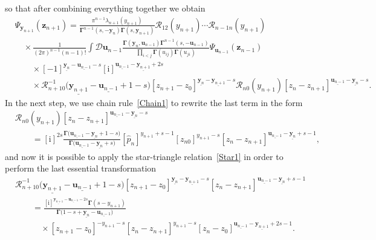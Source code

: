 \documentclass[pdftex]{sigma}
\renewcommand{\imath}{\mathrm{i}}
\numberwithin{equation}{section}
\begin{document}
so that after combining everything together we obtain
\begin{align*}
	&
\Psi_{\bm{y}_{n+1}}(\bm{z}_{n+1}) =
\frac{\pi^{n-1} \lambda_{n+1}(y_{n+1})}
{\mathbf{\Gamma}^{n-1}(s ,-\bm{y}_{n})
\mathbf{\Gamma}(s ,\bm{y}_{n+1})}
\mathcal{R}_{12}(y_{n+1})\cdots
\mathcal{R}_{n-1 n}(y_{n+1})\\
& \quad\times
\frac{1}
{(2\pi)^{n-1} (n-1)!} \int \mathcal{D}\bm{u}_{n-1}
\frac{\mathbf{\Gamma}(\bm y_{n},\bm u_{n-1}) \mathbf{\Gamma}^{n-1}(s ,-\bm{u}_{n-1})}
{\prod\limits_{i<j}\mathbf{\Gamma}(u_{ij})\mathbf{\Gamma}(u_{ji})}
\Psi_{\bm{u}_{n-1}}(\bm{z}_{n-1}) \\
& \qquad \times
[-1]^{\underline{\bm{y}_{n}}-\underline{\bm{u}_{n-1}}-s}
[\imath]^{\underline{\bm{u}_{n-1}}-\underline{\bm{y}_{n+1}}+2s}
\\
& \qquad \times
\mathcal{R}^{-1}_{n+1 0}
\bigl(\underline{\bm{y}_{n+1}}-\underline{\bm{u}_{n-1}}+1-s\bigr)
[z_{n+1}-z_0]^{\underline{\bm{y}_{n}}-\underline{\bm{y}_{n+1}}-s}
\mathcal{R}_{n 0}(y_{n+1})
[z_n-z_{n+1}]^{\underline{\bm{u}_{n-1}}-\underline{\bm{y}_{n}}-s}.
\end{align*}
In the next step, we use chain rule~\eqref{Chain1} to rewrite the
last term in the form
\begin{align*}
&
\mathcal{R}_{n 0}(y_{n+1})
[z_n-z_{n+1}]^{\underline{\bm{u}_{n-1}}-\underline{\bm{y}_{n}}-s} \\
& \qquad =
[\imath]^{2s}\frac{\mathbf{\Gamma}\bigl(\underline{\bm{u}_{n-1}}-
\underline{\bm{y}_{n}}+1-s\bigr)}
{\mathbf{\Gamma}\bigl(\underline{\bm{u}_{n-1}}-
\underline{\bm{y}_{n}}+s\bigr)}
[\hat{p}_n]^{y_{n+1}+s-1}
[z_{n0}]^{y_{n+1}-s}
[z_n-z_{n+1}]^{\underline{\bm{u}_{n-1}}-\underline{\bm{y}_{n}}+s-1} ,
\end{align*}
and now it is possible to apply the star-triangle relation~\eqref{Star1}
in order to perform the last essential transformation
\begin{align*}
&
\mathcal{R}^{-1}_{n+1 0}
\bigl(\underline{\bm{y}_{n+1}}-\underline{\bm{u}_{n-1}}+1-s\bigr)
[z_{n+1}-z_0]^{\underline{\bm{y}_{n}}-\underline{\bm{y}_{n+1}}-s}
[z_n-z_{n+1}]^{\underline{\bm{u}_{n-1}}-\underline{\bm{y}_{n}}+s-1} \\
& \qquad =
\frac{[\imath]^{\underline{\bm{y}_{n+1}}-
\underline{\bm{u}_{n-1}}-2s} \mathbf{\Gamma}(s-y_{n+1})}
{\mathbf{\Gamma}\bigl(1-s+\underline{\bm{y}_{n}}-
\underline{\bm{u}_{n-1}}\bigr)} \\
& \qquad\quad \times
[z_{n+1}-z_0]^{-y_{n+1}-s}
[z_n-z_{n+1}]^{y_{n+1}-s}
[z_n-z_0]^{\underline{\bm{u}_{n-1}}-
\underline{\bm{y}_{n+1}}+2s-1} .
\end{align*}
\end{document}
